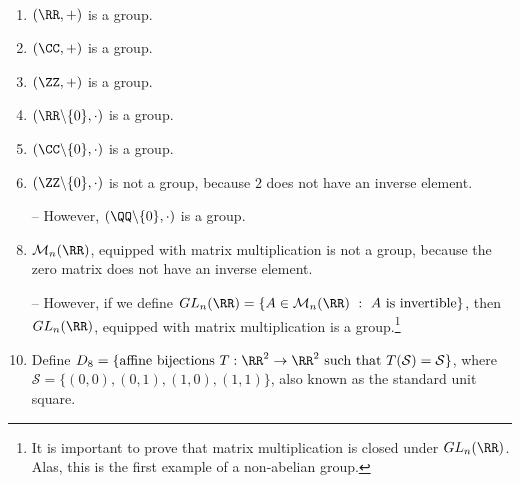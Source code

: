 \begin{exmp}~
	\begin{enumerate}
		\item $(\RR, +)$ is a group.
		\item $(\CC, +)$ is a group.
		\item $(\ZZ, +)$ is a group.
		\item $(\RR\backslash\{0\}, \cdot)$ is a group.
		\item $(\CC\backslash\{0\}, \cdot)$ is a group.
		\item $(\ZZ\backslash\{0\}, \cdot)$ is not a group, because $2$ does not have an inverse element.
		\item[--] However, $(\QQ\backslash\{0\}, \cdot)$ is a group.
		\item $\mathcal{M}_n(\RR)$, equipped with matrix multiplication is not a group, because the zero matrix does not have an inverse element.
		\item[--] However, if we define $GL_n(\RR) = \{A \in \mathcal{M}_n(\RR)\ :\ \text{$A$ is invertible}\}$, then $GL_n(\RR)$, equipped with matrix multiplication is a group.\footnote{It is important to prove that matrix multiplication is closed under $GL_n(\RR)$. Alas, this is the first example of a non-abelian group.}
		
		\item Define $D_8 = \{\text{affine bijections}\ T:\RR^2 \to \RR^2\ \text{such that}\ T(\mathcal{S}) = \mathcal{S}\}$, where $\mathcal{S} = \{(0,0), (0,1), (1, 0), (1, 1)\}$, also known as the standard unit square.
			
	\end{enumerate}
\end{exmp}

